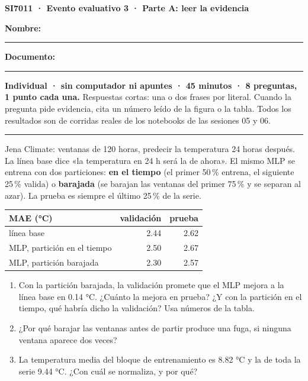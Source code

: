 \documentclass[10.5pt,a4paper]{article}
\newcommand{\resp}[1]{\par\vspace{#1}}
\newcommand{\preg}[1]{\vspace{4pt}{\large\bfseries #1}\par\vspace{3pt}}
\begin{document}
{\Large\bfseries SI7011 · Evento evaluativo 3 · Parte A: leer la evidencia}\par\vspace{10pt}
\textbf{Nombre:} \rule{8cm}{0.4pt}\hfill\textbf{Documento:} \rule{4cm}{0.4pt}\par\vspace{8pt}
\textbf{Individual · sin computador ni apuntes · 45 minutos · 8 preguntas, 1 punto cada una.}
Respuestas cortas: una o dos frases por literal. Cuando la pregunta pide evidencia, cita un número leído de la figura o la tabla.
Todos los resultados son de corridas reales de los notebooks de las sesiones 05 y 06.
\vspace{6pt}\hrule\vspace{6pt}

\preg{1. Partir una serie de tiempo}
Jena Climate: ventanas de 120 horas, predecir la temperatura 24 horas después. La línea base dice «la temperatura en 24 h será la de ahora». El mismo MLP se entrena con dos particiones: \textbf{en el tiempo} (el primer 50\,\% entrena, el siguiente 25\,\% valida) o \textbf{barajada} (se barajan las ventanas del primer 75\,\% y se separan al azar). La prueba es siempre el último 25\,\% de la serie.\par\vspace{4pt}
\begin{center}
\begin{tabular}{lrr}
\toprule
MAE (°C) & validación & prueba \\
\midrule
línea base & 2.44 & 2.62 \\
MLP, partición en el tiempo & 2.50 & 2.67 \\
MLP, partición barajada & 2.30 & 2.57 \\
\bottomrule
\end{tabular}
\end{center}
\begin{enumerate}
\item Con la partición barajada, la validación promete que el MLP mejora a la línea base en 0.14 °C. ¿Cuánto la mejora en prueba? ¿Y con la partición en el tiempo, qué habría dicho la validación? Usa números de la tabla.\resp{2.0cm}
\item ¿Por qué barajar las ventanas antes de partir produce una fuga, si ninguna ventana aparece dos veces?\resp{1.6cm}
\item La temperatura media del bloque de entrenamiento es 8.82 °C y la de toda la serie 9.44 °C. ¿Con cuál se normaliza, y por qué?\resp{1.4cm}
\end{enumerate}
\end{document}
